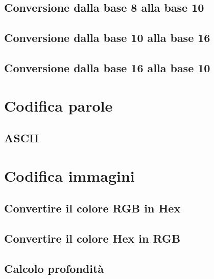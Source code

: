 \documentclass[11pt,fleqn]{book}
\begin{document}
\section{Conversione dalla base 8 alla base 10}

\section{Conversione dalla base 10 alla base 16}

\section{Conversione dalla base 16 alla base 10}




\chapter{Codifica parole}

\section{ASCII}



\chapter{Codifica immagini}

\section{Convertire il colore RGB in Hex}

\section{Convertire il colore Hex in RGB}

\section{Calcolo profondità}
\end{document}
